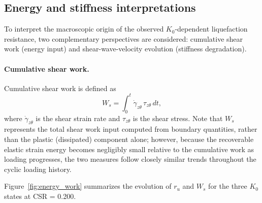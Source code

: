 \documentclass[a4paper,fleqn]{cas-sc}
\newcommand{\Kzero}{\ensuremath{K_0}}
\newcommand{\ru}{\ensuremath{r_u}}
\begin{document}
\subsection{Energy and stiffness interpretations}
\label{subsec:energy_stiffness}

To interpret the macroscopic origin of the observed \Kzero{}-dependent liquefaction resistance, two complementary perspectives are considered: cumulative shear work (energy input) and shear-wave-velocity evolution (stiffness degradation).

\paragraph{Cumulative shear work.}
Cumulative shear work is defined as \citep{TowhataIshihara1985}
\begin{equation}
W_s = \int_0^t \dot{\gamma}_{z\theta}\,\tau_{z\theta}\,dt,
\label{eq:cumulative_shear_work}
\end{equation}
where $\dot{\gamma}_{z\theta}$ is the shear strain rate and $\tau_{z\theta}$ is the shear stress. Note that $W_s$ represents the total shear work input computed from boundary quantities, rather than the plastic (dissipated) component alone; however, because the recoverable elastic strain energy becomes negligibly small relative to the cumulative work as loading progresses, the two measures follow closely similar trends throughout the cyclic loading history.

Figure~\ref{fig:energy_work} summarizes the evolution of $\ru$ and $W_s$ for the three \Kzero{} states at CSR = 0.200.
\end{document}

